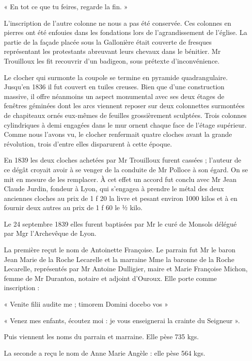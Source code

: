 « En tot ce que tu feires, regarde la fin. »

L'inscription de l'autre colonne ne nous a pas été conservée. Ces colonnes en pierres ont été enfouies dans les fondations lors de l'agrandissement de l'église. La partie de la façade placée sous la Gallonière était couverte de fresques représentant les protestants abreuvant leurs chevaux dans le bénitier. Mr Trouilloux les fit recouvrir d'un badigeon, sous prétexte d'inconvénience.

Le clocher qui surmonte la coupole se termine en pyramide quadrangulaire. Jusqu'en 1836 il fut couvert en tuiles creuses. Bien que d'une construction massive, il offre néanmoins un aspect monumental avec ses deux étages de fenêtres géminées dont les arcs viennent reposer sur deux colonnettes surmontées de chapiteaux ornés eux-mêmes de feuilles grossièrement sculptées. Trois colonnes cylindriques à demi engagées dans le mur ornent chaque face de l'étage supérieur. Comme nous l'avons vu, le clocher renfermait quatre cloches avant la grande révolution, trois d'entre elles disparurent à cette époque.

En 1839 les deux cloches achetées par Mr Trouilloux furent cassées ; l'auteur de ce dégât croyait avoir à se venger de la conduite de Mr Polloce à son égard. On se mit en mesure de les remplacer. À cet effet un accord fut conclu avec Mr Jean Claude Jurdin, fondeur à Lyon, qui s'engagea à prendre le métal des deux anciennes cloches au prix de 1 f 20 la livre et pesant environ 1000 kilos et à en fournir deux autres au prix de 1 f 60 le ½ kilo.

Le 24 septembre 1839 elles furent baptisées par Mr le curé de Monsols délégué par Mgr l'Archevêque de Lyon.

La première reçut le nom de Antoinette Françoise. Le parrain fut Mr le baron Jean Marie de la Roche Lecarelle et la marraine Mme la baronne de la Roche Lecarelle, représentés par Mr Antoine Dulligier, maire et Marie Françoise Michon, femme de Mr Duranton, notaire et adjoint d'Ouroux. Elle porte comme inscription :

« Venite filii audite me ; timorem Domini docebo vos »

« Venez mes enfants, écoutez moi : je vous enseignerai la crainte du Seigneur ».

Puis viennent les noms du parrain et marraine. Elle pèse 735 kgs.

La seconde a reçu le nom de Anne Marie Angèle : elle pèse 564 kgs.

